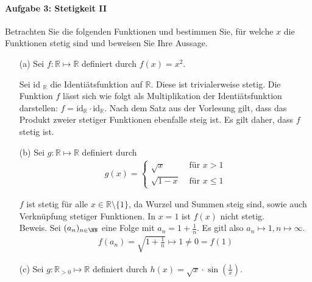	\paragraph*{Aufgabe 3: Stetigkeit II}
	Betrachten Sie die folgenden Funktionen und bestimmen Sie, für welche $ x $ die Funktionen stetig sind und beweisen Sie Ihre Aussage.
	\begin{itemize}
		\item[(a)]
		Sei $ f : \mathbb{ R } \mapsto \mathbb{ R } $ definiert durch $ f( x ) = x^2 $.
		
		Sei id $ _\mathbb{ R }$ die Identiätsfunktion auf $ \mathbb{ R } $.
		Diese ist trivialerweise stetig.
		Die Funktion $ f $ lässt sich wie folgt als Multiplikation der Identiätsfunktion darstellen: $ f = \text{id} _\mathbb{ R } \cdot \text{id} _\mathbb{ R } $.
		Nach dem Satz aus der Vorlesung gilt, dass das Produkt zweier stetiger Funktionen ebenfalle steig ist.
		Es gilt daher, dass $ f $ stetig ist.

		\item[(b)]
		Sei $ g : \mathbb{ R } \mapsto \mathbb{ R } $ definiert durch
		\begin{align*}
			g( x ) =
			\left\lbrace \begin{matrix}
				\sqrt{ x } & \text{ für } x > 1
				\\
				\sqrt{ 1 - x } & \text{ für } x \leq 1
			\end{matrix}\right.
		\end{align*}
		
		$ f $ ist stetig für alle $ x \in \mathbb{ R } \setminus \lbrace 1 \rbrace $, da Wurzel und Summen steig sind, sowie auch Verknüpfung stetiger Funktionen.
		In $ x = 1 $ ist $ f( x ) $ nicht stetig.
		\\ 
		Beweis.
		Sei $ ( a_n )_{n \in \NN } $ eine Folge mit $ a_n = 1 + \tfrac{ 1 }{ n } $.
		Es gitl also $ a_n \mapsto 1 , n \mapsto \infty $.
		\begin{align*}
			f( a_n ) = \sqrt{ 1 + \frac{ 1 }{ n } } \mapsto 1 \neq  0 = f( 1 )
		\end{align*}


		\item[(c)]
		Sei $ g : \mathbb{ R }_{> 0} \mapsto \mathbb{ R } $ definiert durch $ h( x ) = \sqrt{ x } \cdot \sin( \frac{ 1 }{ x } ) $.


\end{itemize}
